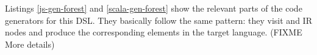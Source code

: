 \documentclass[preprint]{sigplanconf}
\newcommand{\eg}{\emph{e.g.}}
\begin{document}
Listings \ref{js-gen-forest} and \ref{scala-gen-forest} show the relevant parts of the code
generators for this DSL. They basically follow the same pattern: they visit  and
 IR nodes and produce the corresponding elements in the target language. (FIXME More
details)

% 
% 
% 
% 
% 
% 
% 
\end{document}
